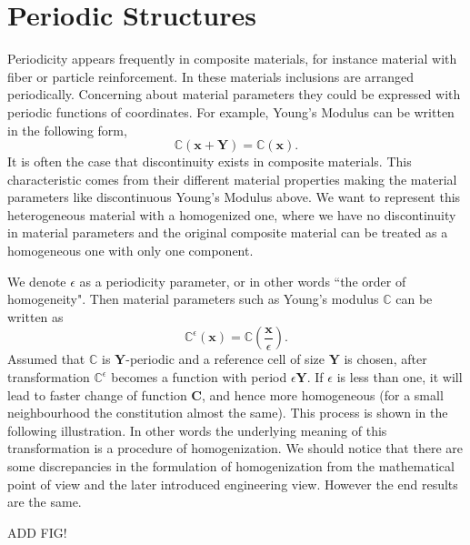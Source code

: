 \documentclass[10pt,a4paper]{scrreprt}
\begin{document}
\section{Periodic Structures}
\label{sec:peri}
Periodicity appears frequently in composite materials, for instance material with fiber or particle reinforcement. In these materials inclusions are arranged periodically. Concerning about material parameters they could be expressed with periodic functions of coordinates. For example, Young's Modulus can be written in the following form,
%
\begin{equation}
\label{eq:periodic 1}
\mathbb{C}(\mathbf{x}+\mathbf{Y}) = \mathbb{C}(\mathbf{x}).
\end{equation}
%
It is often the case that discontinuity exists in composite materials. This characteristic comes from their different material properties making the material parameters like discontinuous Young's Modulus above. We want to represent this heterogeneous material with a homogenized one, where we have no discontinuity in material parameters and the original composite material can be treated as a homogeneous one with only one component.

We denote $\epsilon$ as a periodicity parameter, or in other words ``the order of homogeneity". Then material parameters such as Young's modulus $\mathbb{C}$ can be written as
\begin{equation}
\mathbb{C}^{\epsilon}(\mathbf{x}) = \mathbb{C} \left( \dfrac{\mathbf{x}}{\epsilon} \right).
\end{equation}
Assumed that $\mathbb{C}$ is $\mathbf{Y}$-periodic and a reference cell of size $\mathbf{Y}$ is chosen, after transformation $\mathbb{C}^{\epsilon}$ becomes a function with period $\epsilon \mathbf{Y}$. If $\epsilon$ is less than one, it will lead to faster change of function $\mathbf{C}$, and hence more homogeneous (for a small neighbourhood the constitution almost the same). This process is shown in the following illustration. In other words the underlying meaning of this transformation is a procedure of homogenization. We should notice that there are some discrepancies in the formulation of homogenization from the mathematical point of view and the later introduced engineering view. However the end results are the same.

ADD FIG!
\end{document}
